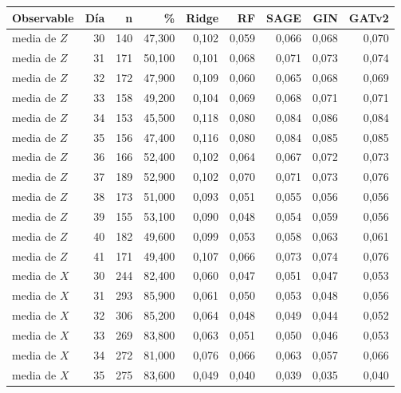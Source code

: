 \begin{table}[htbp]
    \centering
    {\footnotesize
    \begin{tabular}{@{}lrrrrrrrr@{}}
        \toprule
        \textbf{Observable} & \textbf{Día} & \textbf{n} & \textbf{\%} & \textbf{Ridge} & \textbf{RF} & \textbf{SAGE} & \textbf{GIN} & \textbf{GATv2} \\
        \midrule
        media de $Z$ & 30 & 140 & 47,300 & 0,102 & 0,059 & 0,066 & 0,068 & 0,070 \\
        media de $Z$ & 31 & 171 & 50,100 & 0,101 & 0,068 & 0,071 & 0,073 & 0,074 \\
        media de $Z$ & 32 & 172 & 47,900 & 0,109 & 0,060 & 0,065 & 0,068 & 0,069 \\
        media de $Z$ & 33 & 158 & 49,200 & 0,104 & 0,069 & 0,068 & 0,071 & 0,071 \\
        media de $Z$ & 34 & 153 & 45,500 & 0,118 & 0,080 & 0,084 & 0,086 & 0,084 \\
        media de $Z$ & 35 & 156 & 47,400 & 0,116 & 0,080 & 0,084 & 0,085 & 0,085 \\
        media de $Z$ & 36 & 166 & 52,400 & 0,102 & 0,064 & 0,067 & 0,072 & 0,073 \\
        media de $Z$ & 37 & 189 & 52,900 & 0,102 & 0,070 & 0,071 & 0,073 & 0,076 \\
        media de $Z$ & 38 & 173 & 51,000 & 0,093 & 0,051 & 0,055 & 0,056 & 0,056 \\
        media de $Z$ & 39 & 155 & 53,100 & 0,090 & 0,048 & 0,054 & 0,059 & 0,056 \\
        media de $Z$ & 40 & 182 & 49,600 & 0,099 & 0,053 & 0,058 & 0,063 & 0,061 \\
        media de $Z$ & 41 & 171 & 49,400 & 0,107 & 0,066 & 0,073 & 0,074 & 0,076 \\
        media de $X$ & 30 & 244 & 82,400 & 0,060 & 0,047 & 0,051 & 0,047 & 0,053 \\
        media de $X$ & 31 & 293 & 85,900 & 0,061 & 0,050 & 0,053 & 0,048 & 0,056 \\
        media de $X$ & 32 & 306 & 85,200 & 0,064 & 0,048 & 0,049 & 0,044 & 0,052 \\
        media de $X$ & 33 & 269 & 83,800 & 0,063 & 0,051 & 0,050 & 0,046 & 0,053 \\
        media de $X$ & 34 & 272 & 81,000 & 0,076 & 0,066 & 0,063 & 0,057 & 0,066 \\
        media de $X$ & 35 & 275 & 83,600 & 0,049 & 0,040 & 0,039 & 0,035 & 0,040 \\

\end{tabular}}
\end{table}
